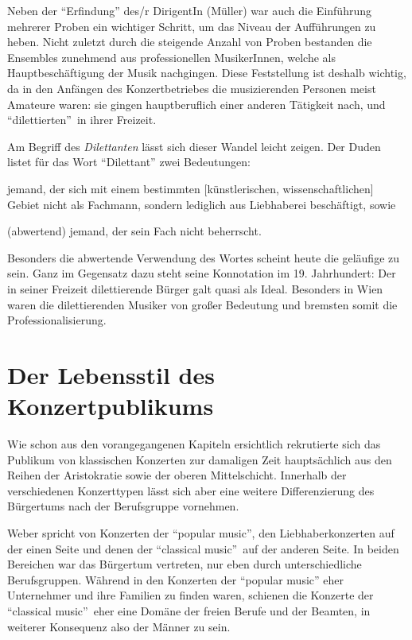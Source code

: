 \documentclass[a4paper, german, oneside]{scrbook}
\begin{document}
Neben der \enquote{Erfindung} des/r DirigentIn (Müller) war auch die Einführung mehrerer Proben ein wichtiger Schritt, um das Niveau der Aufführungen zu heben. Nicht zuletzt durch die steigende Anzahl von Proben bestanden die Ensembles zunehmend aus professionellen MusikerInnen, welche als Hauptbeschäftigung der Musik nachgingen. Diese Feststellung ist deshalb wichtig, da in den Anfängen des Konzertbetriebes die musizierenden Personen meist Amateure waren: sie gingen hauptberuflich einer anderen Tätigkeit nach, und \enquote{dilettierten} in ihrer Freizeit.

Am Begriff des \emph{Dilettanten} lässt sich dieser Wandel leicht zeigen. Der Duden listet für das Wort \enquote{Dilettant} zwei Bedeutungen:
\begin{inparaenum}[(a)]
	\item jemand, der sich mit einem bestimmten [künstlerischen, wissenschaftlichen] Gebiet nicht als Fachmann, sondern lediglich aus Liebhaberei beschäftigt, sowie
	\item (abwertend) jemand, der sein Fach nicht beherrscht.
\end{inparaenum}
\parencite{Dilettant}

Besonders die abwertende Verwendung des Wortes scheint heute die geläufige zu sein. Ganz im Gegensatz dazu steht seine Konnotation im 19. Jahrhundert: Der in seiner Freizeit dilettierende Bürger galt quasi als Ideal. Besonders in Wien waren die dilettierenden Musiker von großer Bedeutung und bremsten somit die Professionalisierung. \parencite[vgl.][88]{weber_music_2004}



\section{Der Lebensstil des Konzertpublikums} %
\label{lebensstil}
Wie schon aus den vorangegangenen Kapiteln ersichtlich rekrutierte sich das Publikum von klassischen Konzerten zur damaligen Zeit hauptsächlich aus den Reihen der Aristokratie sowie der oberen Mittelschicht. Innerhalb der verschiedenen Konzerttypen lässt sich aber eine weitere Differenzierung des Bürgertums nach der Berufsgruppe vornehmen.

Weber spricht von Konzerten der \enquote{popular music}, den Liebhaberkonzerten auf der einen Seite und denen der \enquote{classical music} auf der anderen Seite. In beiden Bereichen war das Bürgertum vertreten, nur eben durch unterschiedliche Berufsgruppen. Während in den Konzerten der \enquote{popular music} eher Unternehmer und ihre Familien zu finden waren, schienen die Konzerte der \enquote{classical music} eher eine Domäne der freien Berufe und der Beamten, in weiterer Konsequenz also der Männer zu sein. \parencite[vgl.][S. 63 und 66]{weber_music_2004}
\end{document}

